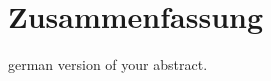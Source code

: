 \section*{Zusammenfassung}
german version of your abstract.


\cleardoublepage
\tableofcontents


\cleardoublepage
\listoffigures


\cleardoublepage

